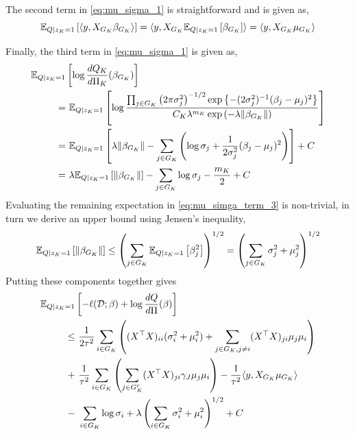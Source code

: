 \documentclass[12pt]{article}
\begin{document}
The second term in \eqref{eq:mu_sigma_1} is straightforward and is given as,
\begin{equation} \label{eq:mu_sigma_term_2}
    \mathbb{E}_{Q | z_K = 1} \left[ \langle y, X_{G_K} \beta_{G_K} \rangle  \right]
=   
    \langle y, X_{G_K} \mathbb{E}_{Q | z_K = 1} \left[ \beta_{G_K} \right] \rangle   
=
    \langle y, X_{G_K} \mu_{G_K} \rangle  
\end{equation}

Finally, the third term in \eqref{eq:mu_sigma_1} is given as,
\begin{align}
    \mathbb{E}_{Q | z_K = 1 } & \left[ \log \frac{dQ_K}{d\Pi_K} (\beta_{G_K}) \right]
    \nonumber \\
= &\
    \mathbb{E}_{Q | z_K = 1 } \left[ 
	\log \frac
	{\prod_{j \in G_K} \left( 2 \pi \sigma_j^2 \right)^{-1/2} \exp \left\{ -(2\sigma^2_{j})^{-1}(\beta_{j} - \mu_j )^2 \right\}}
	{C_K \lambda^{m_K} \exp\left( - \lambda \| \beta_{G_K} \| \right)}
    \right] \nonumber \\
= &\
    \mathbb{E}_{Q | z_K = 1 } \left[ 
	\lambda \| \beta_{G_K} \|
	- \sum_{j \in G_K} \left( 
	    \log{\sigma_j} 
	    + \frac{1}{2\sigma_j^2} (\beta_{j} - \mu_j)^2
	\right)
    \right] + C \nonumber \\
= &\
    \lambda \mathbb{E}_{Q | z_K = 1 } \left[ 
	\| \beta_{G_K} \|
    \right] 
    - \sum_{j \in G_K} \log{\sigma_j} 
    - \frac{m_K}{2} 
    + C 
    \label{eq:mu_simga_term_3}
\end{align}
Evaluating the remaining expectation in \eqref{eq:mu_simga_term_3} is non-trivial, in turn we derive an upper bound using Jensen's inequality,
\begin{equation} \label{eq:mu_sigma_upper}
    \mathbb{E}_{Q | z_K = 1 } \left[ 
	\| \beta_{G_K} \|
    \right] 
\leq
    \left( \sum_{j \in G_K} 
	\mathbb{E}_{Q | z_K = 1 } \left[ \beta_{j}^2 \right] 
    \right)^{1/2} 
=
    \left( \sum_{j \in G_K} 
	\sigma_j^2 + \mu_j^2
    \right)^{1/2} 
\end{equation}
Putting these components together gives
\begin{equation} \label{eq:mu_sigma_main}
\begin{aligned}
    \mathbb{E}_{Q  | z_K = 1} & \left[ 
	- \ell(\mathcal{D}; \beta) + \log \frac{dQ}{d\Pi}(\beta) 
    \right]  \\
\leq &\
    \frac{1}{2\tau^2} 
    \sum_{i \in G_K} \left( 
	    (X^\top X)_{ii} (\sigma_i^2 + \mu_i^2)
	+
	\sum_{j \in G_K, j\neq i} 
	    (X^\top X)_{ji} \mu_j \mu_i
    \right ) \\
+ &\
    \frac{1}{\tau^2} 
    \sum_{i \in G_K} \left( 
    \sum_{j \in G_K^c} (X^\top X)_{ji} 
	\gamma_{J} \mu_j \mu_i
    \right )
-
    \frac{1}{\tau^2}
    \langle y, X_{G_K} \mu_{G_K} \rangle   \\
- &\
    \sum_{i \in G_K} \log{\sigma_i}
+
    \lambda \left( \sum_{i \in G_K} 
	\sigma_i^2 + \mu_i^2
    \right)^{1/2} + C
\end{aligned}
\end{equation}
\end{document}
